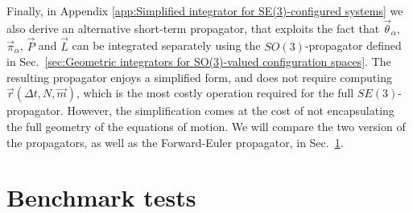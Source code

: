Finally, in Appendix \ref{app:Simplified integrator for SE(3)-configured systems} we also derive an alternative short-term propagator, that exploits the fact that $\vec{\theta}_\alpha$, $\vec{\pi}_\alpha$, $\vec{P}$ and $\vec{L}$ can be integrated separately using the $SO(3)$-propagator defined in Sec.~\ref{sec:Geometric integrators for SO(3)-valued configuration spaces}. The resulting propagator enjoys a simplified form, and does not require computing $\vec{r}(\Delta t, N, \vec{m})$, which is the most costly operation required for the full $SE(3)$-propagator. However, the simplification comes at the cost of not encapsulating the full geometry of the equations of motion. We will compare the two version of the propagators, as well as the Forward-Euler propagator, in Sec.~\ref{sec:lie group integrators applications}.


\section{Benchmark tests} \label{sec:lie group integrators applications}


